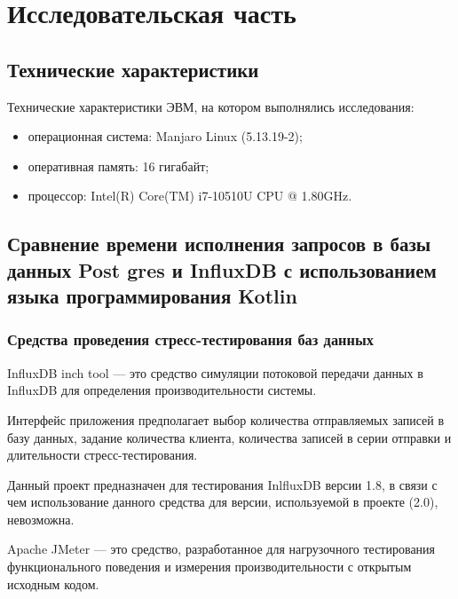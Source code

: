 \section{Исследовательская часть}

\subsection{Технические характеристики}

Технические характеристики ЭВМ, на котором выполнялись исследования:

\begin{itemize}[leftmargin=1.6\parindent]
\item операционная система: Manjaro Linux (5.13.19-2);
\item оперативная память: 16 гигабайт;
\item процессор: Intel(R) Core(TM) i7-10510U CPU @ 1.80GHz.
\end{itemize}

\subsection{Сравнение времени исполнения запросов в базы данных Post \- gres и InfluxDB с использованием языка программирования \newline Kotlin}

\subsubsection{Средства проведения стресс-тестирования баз данных}

InfluxDB inch tool \cite{inchTool} --- это средство симуляции потоковой передачи данных в InfluxDB для определения производительности системы.

Интерфейс приложения предполагает выбор количества отправляемых \newline записей в базу данных, задание количества клиента, количества \newline записей в серии отправки и длительности стресс-тестирования.

Данный проект предназначен для тестирования InlfluxDB версии 1.8, в связи с чем использование данного средства для версии, используемой в проекте (2.0), невозможна.

Apache JMeter \cite{jmeter} --- это средство, разработанное для нагрузочного тестирования функционального поведения и измерения производительности с открытым исходным кодом.

